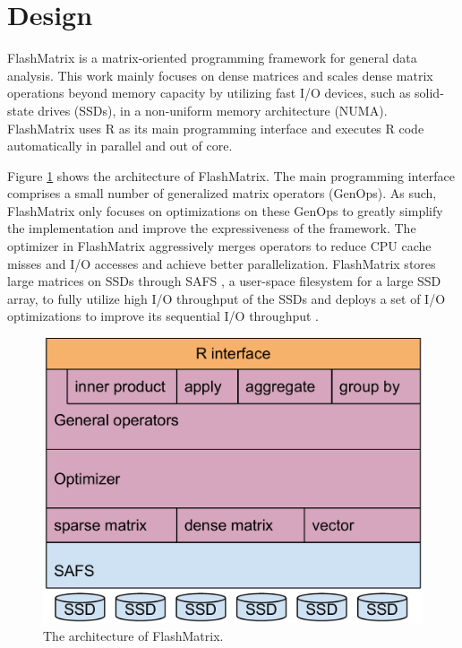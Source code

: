 \section{Design}

FlashMatrix is a matrix-oriented programming framework for general data analysis.
This work mainly focuses on dense matrices and scales
dense matrix operations beyond memory capacity by utilizing fast I/O devices,
such as solid-state drives (SSDs), in a non-uniform memory architecture (NUMA).
FlashMatrix uses R as its main programming interface and executes R code
automatically in parallel and out of core.

Figure \ref{fig:arch} shows the architecture of FlashMatrix. The main programming
interface comprises a small number of generalized matrix operators (GenOps).
As such, FlashMatrix only focuses on optimizations on these GenOps
to greatly simplify the implementation and improve the expressiveness of
the framework. The optimizer in FlashMatrix aggressively merges operators to
reduce CPU cache misses and I/O accesses and achieve better parallelization.
FlashMatrix stores large matrices on SSDs through SAFS \cite{safs},
a user-space filesystem for a large SSD array, to fully utilize high I/O
throughput of the SSDs and deploys a set of I/O optimizations to improve
its sequential I/O throughput \cite{SEM_SpMM}.

\begin{figure}
\centering
\includegraphics[scale=0.3]{./architecture.pdf}
\caption{The architecture of FlashMatrix.}
\label{fig:arch}
\end{figure}

